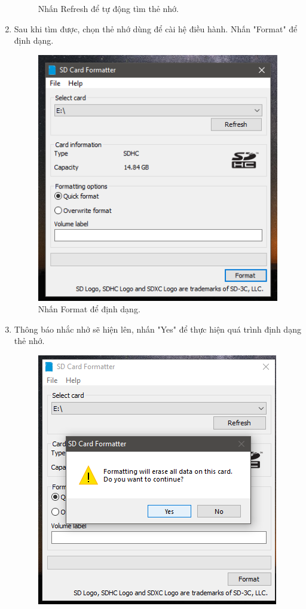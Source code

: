 \begin{enumerate}
\begin{center}
\begin{figure}[htp]
\begin{center}
\end{center}
\caption{Nhấn Refresh để tự động tìm thẻ nhớ.}
\label{sdcardformat}
\end{figure}
\end{center}
\item Sau khi tìm được, chọn thẻ nhớ dùng để cài hệ điều hành. Nhấn "Format" để định dạng.
\begin{center}
\begin{figure}[htp]
\begin{center}
\includegraphics[scale=0.7]{image3/buoc2cach1s3.png}
\end{center}
\caption{Nhấn Format để định dạng.}
\label{refhinh1}
\end{figure}
\end{center}
\item Thông báo nhắc nhở sẽ hiện lên, nhấn "Yes" để thực hiện quá trình định dạng thẻ nhớ.
\begin{center}
\begin{figure}[htp]
\begin{center}
 \includegraphics[scale=0.65]{image3/buoc2cach1s4.png}

\end{center}
\end{figure}
\end{center}
\end{enumerate}
